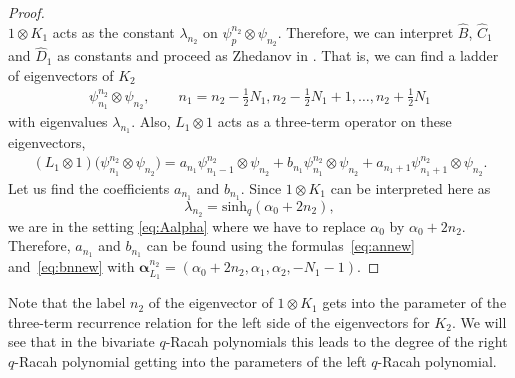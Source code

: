 \documentclass[10pt,a4paper]{amsart}
\numberwithin{equation}{section}
\newcommand{\half}{\frac{1}{2}}
\newcommand{\psimn}[2]{\psi_{#1}^{#2}\otimes \psi_{#2}}
\newcommand{\shq}{\mathrm{sinh}_q}
\begin{document}
\begin{proof}
\[	\]
	$1\otimes K_1$ acts as the constant $\lambda_{n_2}$ on $\psimn{p}{n_2}$. Therefore, we can interpret $\hat{B}$, $\hat{C}_1$ and $\hat{D}_1$ as constants and proceed as Zhedanov in \cite{Zhedanov1991}. That is, we can find a ladder of eigenvectors of $K_2$
	\begin{gather*}
		\psimn{n_1}{n_2},\qquad n_1= n_2-\half N_1, n_2-\half N_1 +1,\ldots, n_2+\half N_1
	\end{gather*}		
	with eigenvalues $\lambda_{n_1}$. Also, $L_1\otimes 1$ acts as a three-term operator on these eigenvectors,
\begin{gather*}
(L_1\otimes 1)\big(\psi_{n_1}^{n_2}\otimes\psi_{n_2}\big)= a_{n_1} \psi_{n_1-1}^{n_2}\otimes\psi_{n_2} + b_{n_1} \psi_{n_1}^{n_2}\otimes\psi_{n_2} + a_{n_1+1}\psi_{n_1+1}^{n_2}\otimes\psi_{n_2}.
\end{gather*}
Let us find the coefficients $a_{n_1}$ and $b_{n_1}$. Since $1\otimes K_1$ can be interpreted here as
\[
\lambda_{n_2}=\shq(\alpha_0 +2n_2),
\]
	we are in the setting \eqref{eq:Aalpha} where we have to replace $\alpha_0$ by $\alpha_0 + 2n_2$. Therefore, $a_{n_1}$ and $b_{n_1}$ can be found using the formulas~\eqref{eq:annew} and~\eqref{eq:bnnew} with $\bm{\alpha}_{L_1}^{n_2}=(\alpha_0+2n_2,\alpha_1,\alpha_2,-N_1-1)$.
\end{proof}
\begin{Remark}
	Note that the label $n_2$ of the eigenvector of $1\otimes K_1$ gets into the parameter of the three-term recurrence relation for the left side of the eigenvectors for $K_2$. We will see that in the bivariate $q$-Racah polynomials this leads to the degree of the right $q$-Racah polynomial getting into the parameters of the left $q$-Racah polynomial.
\end{Remark}
\end{document}
